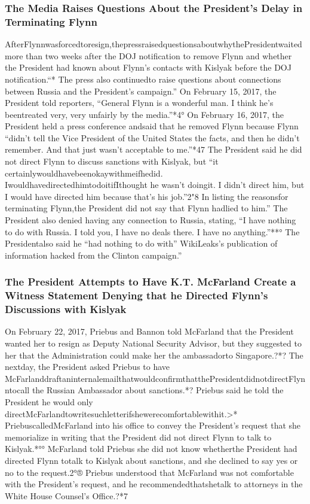 \subsubsection{The Media Raises Questions About the President's Delay in Terminating Flynn}

AfterFlynnwasforcedtoresign,thepressraisedquestionsaboutwhythePresidentwaited more than two weeks after the DOJ notification to remove Flynn and whether the President had known about Flynn’s contacts with Kislyak before the DOJ notification.“*
The press also continuedto raise questions about connections between Russia and the President’s campaign.”
On February 15, 2017, the President told reporters, “General Flynn is a wonderful man.
I think he’s beentreated very, very unfairly by the media.”*4°
On February 16, 2017, the President held a press conference andsaid that he removed Flynn because Flynn “didn’t tell the Vice President of the United States the facts, and then he didn’t remember.
And that just wasn’t acceptable to me.”*47
The President said he did not direct Flynn to discuss sanctions with Kislyak, but “it certainlywouldhavebeenokaywithmeifhedid.
IwouldhavedirectedhimtodoitifIthought he wasn’t doingit.
I didn’t direct him, but I would have directed him because that’s his job.”2"8
In listing the reasonsfor terminating Flynn,the President did not say that Flynn hadlied to him.”
The President also denied having any connection to Russia, stating, “I have nothing to do with Russia.
I told you, I have no deals there.
I have no anything.”**°
The Presidentalso said he “had nothing to do with” WikiLeaks’s publication of information hacked from the Clinton campaign.”

\subsubsection{The President Attempts to Have K.T. McFarland Create a Witness Statement Denying that he Directed Flynn's Discussions with Kislyak}

On February 22, 2017, Priebus and Bannon told McFarland that the President wanted her to resign as Deputy National Security Advisor, but they suggested to her that the Administration could make her the ambassadorto Singapore.?*?
The nextday, the President asked Priebus to have McFarlanddraftaninternalemailthatwouldconfirmthatthePresidentdidnotdirectFlynntocall the Russian Ambassador about sanctions.*?
Priebus said he told the President he would only directMcFarlandtowritesuchletterifshewerecomfortablewithit.>*
PriebuscalledMcFarland into his office to convey the President’s request that she memorialize in writing that the President did not direct Flynn to talk to Kislyak.*°°
McFarland told Priebus she did not know whetherthe President had directed Flynn totalk to Kislyak about sanctions, and she declined to say yes or no to the request.2°®
Priebus understood that McFarland was not comfortable with the President’s request, and he recommendedthatshetalk to attorneys in the White House Counsel’s Office.?*7

